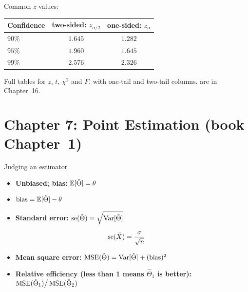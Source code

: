 Common $z$ values:

\begin{center}
\small
\begin{tabular}{lcc}
\toprule
Confidence & two-sided: $z_{\alpha/2}$ & one-sided: $z_\alpha$ \\
\midrule
$90\%$ & $1.645$ & $1.282$ \\
$95\%$ & $1.960$ & $1.645$ \\
$99\%$ & $2.576$ & $2.326$ \\
\bottomrule
\end{tabular}
\end{center}

Full tables for $z$, $t$, $\chi^2$ and $F$, with one-tail and two-tail columns, are in Chapter~16.

\section{Chapter 7: Point Estimation (book Chapter~1)}

\begin{formulabox}{Judging an estimator}
\begin{itemize}
  \item \textbf{Unbiased; bias:} $\mathbb{E}[\hat\Theta]=\theta$
  \item $\text{bias}=\mathbb{E}[\hat\Theta]-\theta$
  \item \textbf{Standard error:} $\operatorname{se}(\hat\Theta)=\sqrt{\operatorname{Var}[\hat\Theta]}$
\end{itemize}
\[ \operatorname{se}(\bar{X})=\frac{\sigma}{\sqrt n} \]
\begin{itemize}
  \item \textbf{Mean square error:} $\operatorname{MSE}(\hat\Theta)=\operatorname{Var}[\hat\Theta]+(\text{bias})^2$
  \item \textbf{Relative efficiency (less than 1 means $\hat\Theta_1$ is better):} $\operatorname{MSE}(\hat\Theta_1)\big/\operatorname{MSE}(\hat\Theta_2)$
\end{itemize}
\end{formulabox}

